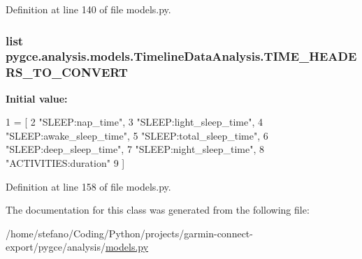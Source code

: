 Definition at line 140 of file models.\+py.

\subsubsection[{\texorpdfstring{T\+I\+M\+E\+\_\+\+H\+E\+A\+D\+E\+R\+S\+\_\+\+T\+O\+\_\+\+C\+O\+N\+V\+E\+RT}{TIME_HEADERS_TO_CONVERT}}]{\setlength{\rightskip}{0pt plus 5cm}list pygce.\+analysis.\+models.\+Timeline\+Data\+Analysis.\+T\+I\+M\+E\+\_\+\+H\+E\+A\+D\+E\+R\+S\+\_\+\+T\+O\+\_\+\+C\+O\+N\+V\+E\+RT\hspace{0.3cm}{\ttfamily [static]}}\hypertarget{classpygce_1_1analysis_1_1models_1_1_timeline_data_analysis_afaebf4ce7e847ff4c32a7b9b799fd94d}{}\label{classpygce_1_1analysis_1_1models_1_1_timeline_data_analysis_afaebf4ce7e847ff4c32a7b9b799fd94d}
{\bfseries Initial value\+:}
\begin{DoxyCode}
1 = [
2         \textcolor{stringliteral}{"SLEEP:nap\_time"},
3         \textcolor{stringliteral}{"SLEEP:light\_sleep\_time"},
4         \textcolor{stringliteral}{"SLEEP:awake\_sleep\_time"},
5         \textcolor{stringliteral}{"SLEEP:total\_sleep\_time"},
6         \textcolor{stringliteral}{"SLEEP:deep\_sleep\_time"},
7         \textcolor{stringliteral}{"SLEEP:night\_sleep\_time"},
8         \textcolor{stringliteral}{"ACTIVITIES:duration"}
9     ]
\end{DoxyCode}


Definition at line 158 of file models.\+py.



The documentation for this class was generated from the following file\+:\begin{DoxyCompactItemize}
\item 
/home/stefano/\+Coding/\+Python/projects/garmin-\/connect-\/export/pygce/analysis/\hyperlink{models_8py}{models.\+py}\end{DoxyCompactItemize}
